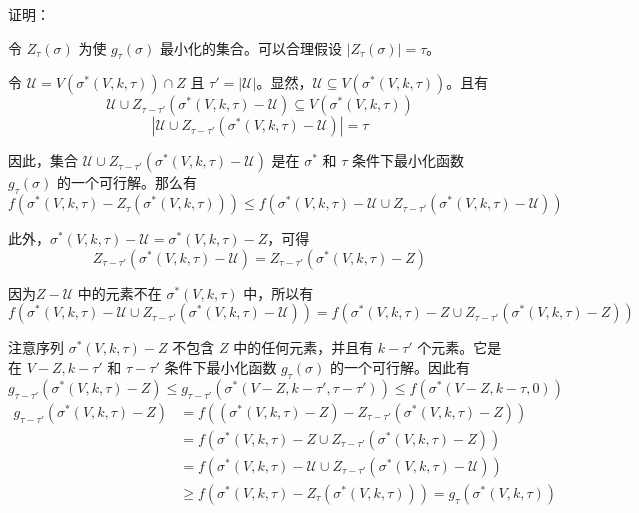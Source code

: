 \noindent 证明：

令 $Z_{\tau}(\sigma)$ 为使 $g_{\tau}(\sigma)$ 最小化的集合。可以合理假设 $|Z_{\tau}(\sigma)|=\tau$。

令 $\mathcal{U}=V(\sigma^*(V,k,\tau)) \cap Z$ 且 $\tau'=|\mathcal{U}|$。显然，$\mathcal{U}\subseteq V(\sigma^*(V,k,\tau))$。且有
\begin{equation}
\mathcal{U} \cup Z_{\tau-\tau'}(\sigma^*(V,k,\tau)-\mathcal{U}) \subseteq V(\sigma^*(V,k,\tau)) 
\end{equation}
\begin{equation}
|\mathcal{U} \cup Z_{\tau-\tau'}(\sigma^*(V,k,\tau)-\mathcal{U})| =\tau
\end{equation}

因此，集合 $\mathcal{U} \cup Z_{\tau-\tau'}(\sigma^*(V,k,\tau)-\mathcal{U})$ 是在 $\sigma^*$ 和 $\tau$ 条件下最小化函数 $g_\tau(\sigma)$ 的一个可行解。那么有
\begin{equation}
    f(\sigma^*(V,k,\tau) -Z_\tau(\sigma^*(V,k,\tau))) \le f(\sigma^*(V,k,\tau) - \mathcal{U} \cup Z_{\tau-\tau'}(\sigma^*(V,k,\tau)-\mathcal{U}))
\end{equation}

此外，$\sigma^*(V,k,\tau)-\mathcal{U} = \sigma^*(V,k,\tau) - Z$，可得
\begin{equation}
Z_{\tau-\tau'}(\sigma^*(V,k,\tau) - \mathcal{U}) = Z_{\tau-\tau'}(\sigma^*(V,k,\tau) - Z)
\end{equation}

因为$Z-\mathcal{U}$ 中的元素不在 $\sigma^*(V,k,\tau)$ 中，所以有
\begin{equation}
    f( \sigma^*(V,k,\tau) - \mathcal{U} \cup Z_{\tau-\tau'}(\sigma^*(V,k,\tau) - \mathcal{U}) ) = f( \sigma^*(V,k,\tau) - Z \cup Z_{\tau-\tau'}(\sigma^*(V,k,\tau) - Z))
\end{equation}

注意序列 $\sigma^*(V,k,\tau) - Z$ 不包含 $Z$ 中的任何元素，并且有 $k-\tau'$ 个元素。它是在 $V-Z,k-\tau'$ 和 $\tau-\tau'$ 条件下最小化函数 $g_\tau(\sigma)$ 的一个可行解。因此有
\begin{equation}
g_{\tau-\tau'}(\sigma^*(V,k,\tau) - Z)  \le g_{\tau-\tau'}(\sigma^*(V-Z,k-\tau',\tau-\tau')) \le f(\sigma^*(V-Z,k-\tau,0))
\end{equation}
\begin{align}
    g_{\tau-\tau'}(\sigma^*(V,k,\tau) - Z) & = f((\sigma^*(V,k,\tau) - Z) - Z_{\tau-\tau'}(\sigma^*(V,k,\tau) - Z)) \\
    & = f(\sigma^*(V,k,\tau) - Z \cup Z_{\tau-\tau'}(\sigma^*(V,k,\tau) - Z)) \\
    & = f(\sigma^*(V,k,\tau) - \mathcal{U} \cup Z_{\tau-\tau'}(\sigma^*(V,k,\tau) - \mathcal{U})) \\
    & \ge f(\sigma^*(V,k,\tau) - Z_{\tau}(\sigma^*(V,k,\tau))) = g_{\tau}(\sigma^*(V,k,\tau))
\end{align}

